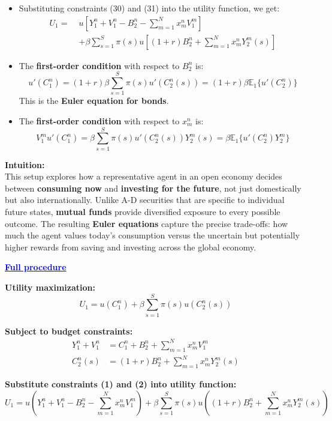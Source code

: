 \documentclass[12pt]{article}
\begin{document}
\begin{itemize}
\begin{itemize}
    \item Substituting constraints (30) and (31) into the utility function, we get:
    \begin{align*}
        U_1 =\; & u \left[ Y_1^n + V_1^n - B_2^n - \sum_{m=1}^{N} x_m^n V_1^m \right] \\
        &+ \beta \sum_{s=1}^{S} \pi(s) u \left[ (1 + r)B_2^n + \sum_{m=1}^{N} x_m^n Y_2^m(s) \right]
    \end{align*}

    \item The \textbf{first-order condition} with respect to \( B_2^n \) is:
    \[
    u'(C_1^n) = (1 + r)\beta \sum_{s=1}^{S} \pi(s) u'(C_2^n(s)) = (1 + r)\beta \mathbb{E}_1\{ u'(C_2^n) \}
    \]
    This is the \textbf{Euler equation for bonds}.

    \item The \textbf{first-order condition} with respect to \( x_m^n \) is:
    \[
    V_1^m u'(C_1^n) = \beta \sum_{s=1}^{S} \pi(s) u'(C_2^n(s)) Y_2^m(s) = \beta \mathbb{E}_1 \{ u'(C_2^n) Y_2^m \} \tag{32}
    \]
\end{itemize}

\vspace{1em}
\textbf{Intuition:} \\
This setup explores how a representative agent in an open economy decides between \textbf{consuming now} and \textbf{investing for the future}, not just domestically but also internationally. Unlike A-D securities that are specific to individual future states, \textbf{mutual funds} provide diversified exposure to every possible outcome. The resulting \textbf{Euler equations} capture the precise trade-offs: how much the agent values today's consumption versus the uncertain but potentially higher rewards from saving and investing across the global economy.


\textcolor{blue}{\textbf{\uline{Full procedure}}}

{\color{blue}
\textbf{Utility maximization:}
\[
U_1 = u(C_1^n) + \beta \sum_{s=1}^{S} \pi(s) u(C_2^n(s))
\]

\textbf{Subject to budget constraints:}
\begin{align*}
Y_1^n + V_1^n &= C_1^n + B_2^n + \sum_{m=1}^{N} x_m^n V_1^m \tag{1} \\
C_2^n(s) &= (1 + r)B_2^n + \sum_{m=1}^{N} x_m^n Y_2^m(s) \tag{2}
\end{align*}

\textbf{Substitute constraints (1) and (2) into utility function:}
\[
U_1 = u\left( Y_1^n + V_1^n - B_2^n - \sum_{m=1}^{N} x_m^n V_1^m \right)
+ \beta \sum_{s=1}^{S} \pi(s) u\left( (1 + r)B_2^n + \sum_{m=1}^{N} x_m^n Y_2^m(s) \right)
\]

}
\end{itemize}
\end{document}
